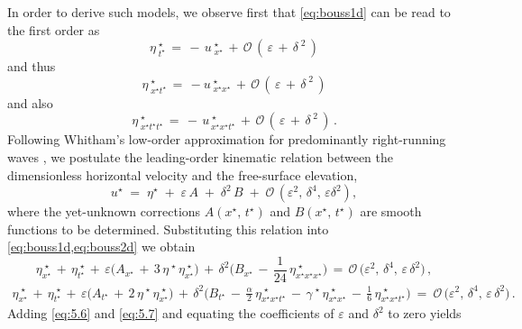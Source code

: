 \documentclass[alpha-refs, 12pt]{wiley-article}
\renewcommand{\O}{\mathcal{O}}
\newcommand{\eps}{\varepsilon}
\begin{document}
In order to derive such models, we observe first that \cref{eq:bouss1d} can be read to the first order as
\begin{equation*}
  \eta^{\;\star}_{\;t^{\star}}\,=\,-\,u^{\;\star}_{\;x^{\star}}\,+\,\O\,(\,\eps\,+\,\delta^{\;2}\,)
\end{equation*}
and thus
\begin{equation*}
  \eta^{\;\star}_{\;x^{\star}t^{\star}}\, = \,-u^{\;\star}_{\;x^{\star}x^{\star}}\,+\,\O\,(\,\eps\,+\,\delta^{\;2}\,)
\end{equation*}
and also
\begin{equation*}
  \eta^{\;\star}_{\;x^{\star}t^{\star}t^{\star}}\, = \,-\,u^{\;\star}_{\,x^{\star}x^{\star}t^{\star}}\,+\,\O\,(\,\eps\,+\,\delta^{\;2}\,)\,.
\end{equation*}
Following Whitham's low-order approximation for predominantly right-running waves \cite{Whitham1999, Dutykh2007}, we postulate the leading-order kinematic relation between the dimensionless horizontal velocity and the free-surface elevation,
\begin{equation}\label{eq:relation}
  u^{\star}\;=\;\eta^{\star}\;+\;\eps\,A\;+\;\delta^{2}\,B\; + \;\O\,(\eps^{2},\,\delta^{4},\,\eps\delta^{2}),
\end{equation}
where the yet-unknown corrections $A(x^{\star},\,t^{\star})$ and $B(x^{\star},\,t^{\star})$ are smooth functions to be determined. Substituting this relation into \cref{eq:bouss1d,eq:bouss2d} we obtain
\begin{equation}\label{eq:5.6}
  \eta^{\;\star}_{x^{\star}}\,+\,\eta^{\;\star}_{t^{\star}}\,+\,
  \eps\bigl(A_{x^{\star}}\,+\,3\,\eta^{\;\star}\,\eta^{\;\star}_{x^{\star}}\bigr)\,+\,
  \delta^{2}\bigl(B_{x^{\star}}\,-\,\frac{1}{24}\,\eta^{\;\star}_{x^{\star}x^{\star}x^{\star}}\bigr)
  \,=\,\O\,\bigl(\eps^{2},\,\delta^{4},\,\eps\,\delta^{2}\bigr)\,,
\end{equation}
\begin{multline}\label{eq:5.7}
  \eta^{\;\star}_{x^{\star}}\,+\,\eta^{\;\star}_{t^{\star}}\,+\,
  \eps\bigl(A_{t^{\star}}\,+\,2\,\eta^{\;\star}\,\eta^{\;\star}_{x^{\star}}\bigr)\,+\,
  \delta^{2}\bigl(B_{t^{\star}}\,-\,\frac{\alpha}{2}\,\eta^{\;\star}_{x^{\star}x^{\star}t^{\star}}\,-\,
  \gamma^{\;\star}\,\eta^{\;\star}_{x^{\star}x^{\star}}\,-\,\frac{1}{6}\,\eta^{\;\star}_{x^{\star}x^{\star}t^{\star}}\bigr)\ =\ \O\,\bigl(\eps^{2},\,\delta^{4},\,\eps\,\delta^{2}\bigr)\,.
\end{multline}
Adding \cref{eq:5.6} and \cref{eq:5.7} and equating the coefficients of
$\eps$ and $\delta^{2}$ to zero yields
\end{document}
